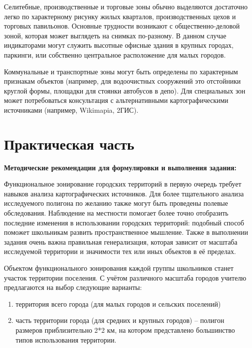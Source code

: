 \documentclass[
  11pt,
]{book}
\begin{document}
Селитебные, производственные и торговые зоны
обычно выделяются достаточно легко по характерному рисунку жилых кварталов,
производственных цехов и торговых павильонов. Основные трудности возникают с
общественно-деловой зоной, которая может выглядеть на снимках по-разному. В
данном случае индикаторами могут служить высотные офисные здания в крупных
городах, паркинги, или собственно центральное расположение для малых городов.

Коммунальные и транспортные зоны могут быть
определены по характерным признакам объектов (например, для водоочистных
сооружений это отстойники круглой формы, площадки для стоянки автобусов в
депо). Для специальных зон может потребоваться консультация с альтернативными
картографическими источниками (например, Wikimapia, 2ГИС).

\section{Практическая часть}\label{ux43fux440ux430ux43aux442ux438ux447ux435ux441ux43aux430ux44f-ux447ux430ux441ux442ux44c-4}

\textbf{Методические рекомендации для формулировки и выполнения задания:}

Функциональное зонирование городских территорий
в первую очередь требует навыков анализа картографических источников. Для более тщательного анализа исследуемого полигона по желанию также могут быть проведены полевые обследования. Наблюдение на местности помогает более точно отобразить последние изменения в использовании городских территорий: подобный способ поможет школьникам развить пространственное мышление. Также в выполнении задания очень важна правильная генерализация, которая зависит от масштаба исследуемой территории и значимости тех или иных объектов в её пределах.

Объектом функционального зонирования каждой группы школьников станет участок территории поселения. С учётом различного масштаба городов учителю предлагаются на выбор следующие варианты:

\begin{enumerate}
\def\labelenumi{\arabic{enumi}.}
\item
  территория всего города (для малых городов и сельских поселений)
\item
  часть территории города (для средних и крупных городов) -- полигон размеров приблизительно 2*2 км, на котором
  представлено большинство типов использования территории.
\end{enumerate}
\end{document}
